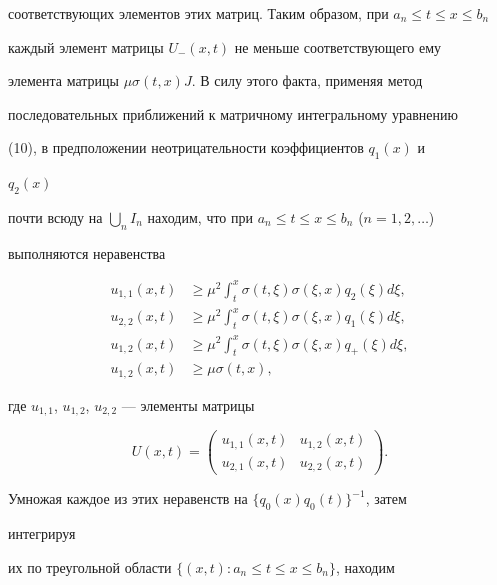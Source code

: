 \begin{pf}
соответствующих элементов этих матриц. Таким образом, при $a_n\le t\le 


x\le b_n$ 


каждый элемент матрицы $U_-(x,t)$ не меньше соответствующего ему 


элемента матрицы $\mu\sigma(t,x)J$. В силу этого факта, применяя метод 


последовательных приближений к матричному интегральному уравнению 


(10), в предположении неотрицательности коэффициентов $q_1(x)$ и 


$q_2(x)$ 


почти всюду на $\bigcup\limits_n I_n$ находим, что при $a_n\le t\le 


x\le b_n$ ($n=1,2,\dotsc$) 


выполняются неравенства 


\begin{align*} 


u_{1,1}(x,t)&\ge \mu^2\int^x_t \sigma(t,\xi)\sigma(\xi,x)q_2(\xi)d\xi,\\ 


u_{2,2}(x,t)&\ge \mu^2\int^x_t \sigma(t,\xi)\sigma(\xi,x)q_1(\xi)d\xi,\\ 


u_{1,2}(x,t)&\ge \mu^2\int^x_t \sigma(t,\xi)\sigma(\xi,x)q_+(\xi)d\xi,\\ 


u_{1,2}(x,t)&\ge \mu\sigma(t,x), 


\end{align*} 


где $u_{1,1}$, $u_{1,2}$, $u_{2,2}$ --- элементы матрицы 


$$ 


U(x,t)= 


\begin{pmatrix} 


u_{1,1}(x,t) & u_{1,2}(x,t) \\ u_{2,1}(x,t) & u_{2,2}(x,t) 


\end{pmatrix} 


. 


$$ 


Умножая каждое из этих неравенств на $\{q_0(x)q_0(t)\}^{-1}$, затем 


интегрируя 


их по треугольной области $\{(x,t):a_n\le t\le x\le b_n\}$, находим 


\begin{align*} 



\end{align*}
\end{pf}
